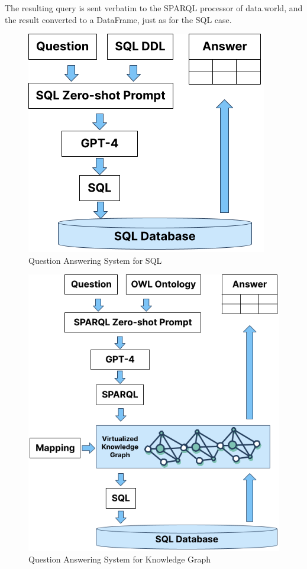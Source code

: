 \documentclass[11pt]{article}
\begin{document}
The resulting query is sent verbatim to the SPARQL processor of data.world, and the result converted to a DataFrame, just as for the SQL case. 

\newpage

\begin{figure}[hbtp]
\centering
\includegraphics[scale=0.5]{submissions/Juan2024/results/sql_system.png}
\caption{Question Answering System for SQL}
\label{fig:SQlSystem}
\end{figure}


\begin{figure}[hbtp]
\centering
\includegraphics[scale=0.4]{submissions/Juan2024/results/sparql_system.png}
\caption{Question Answering System for Knowledge Graph}
\label{fig:SPARQLSystem}
\end{figure}
\end{document}
